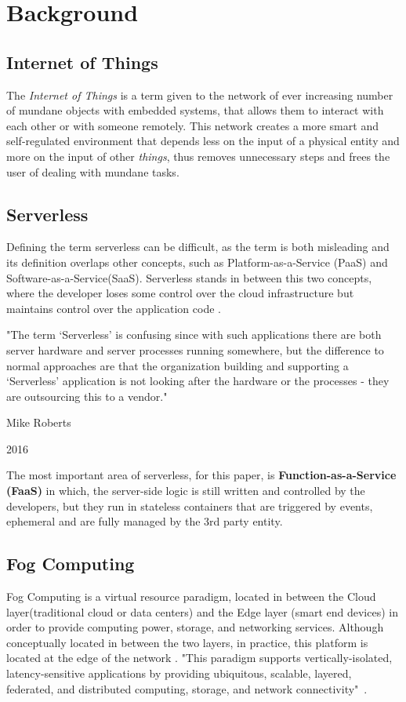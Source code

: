 \documentclass[conference]{IEEEtran}
\begin{document}
\section{Background}

\subsection{Internet of Things}\label{sec:dialecto}
The \textit{Internet of Things} is a term given to the network of ever increasing
number of mundane objects with embedded systems, that allows them to interact with
each other or with someone remotely. This network creates a more smart and self-regulated environment that depends less on the input of a physical entity and more on the input of other \textit{things}, thus removes unnecessary steps and frees the user
of dealing with mundane tasks.

\subsection{Serverless}
Defining the term serverless can be difficult, as the term is both misleading and
its definition overlaps other concepts, such as Platform-as-a-Service (PaaS) and
Software-as-a-Service(SaaS). Serverless stands in between this two concepts, where
the developer loses some control over the cloud infrastructure but maintains
control over the application code \cite{kn:Baldini}.

"The term ‘Serverless’ is confusing since with such applications there are both
server hardware and server processes running somewhere, but the difference to
normal approaches are that the organization building and supporting a ‘Serverless’ application is not looking after the hardware or the processes - they are outsourcing this to a vendor." 

\hfill Mike Roberts

\hfill 2016

The most important area of serverless, for this paper, is
\textbf{Function-as-a-Service (FaaS)} in which, the server-side logic is still
written and controlled by the developers, but they run in stateless containers
that are triggered by events, ephemeral and are fully managed by the 3rd party
entity.

\subsection{Fog Computing}
Fog Computing is a virtual resource paradigm, located in between the Cloud
layer(traditional cloud or data centers) and the Edge layer (smart end devices) in
order to provide computing power, storage, and networking services. Although
conceptually located in between the two layers, in practice, this platform is located at the
edge of the network \cite{kn:Bonomi}. "This paradigm supports vertically-isolated,
latency-sensitive applications by providing ubiquitous, scalable, layered,
federated, and distributed computing, storage, and network connectivity"~\cite{kn:Iorga2017}. 
\end{document}
